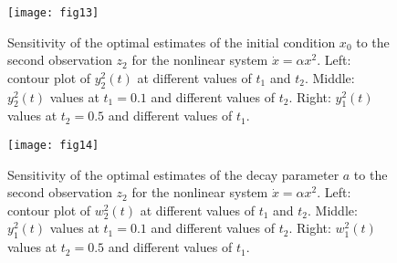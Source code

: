 \documentclass{article}
\begin{document}
\begin{figure}[ht!]
    \centering
    \texttt{[image: fig13]}
    \caption{Sensitivity of the optimal estimates of the initial condition $x_0$ to the second observation $z_2$ for the nonlinear system $\dot{x} = \alpha x^2$. Left: contour plot of $y_2^2(t)$ at different values of $t_1$ and $t_2$. Middle: $y_2^2(t)$ values at $t_1=0.1$ and different values of $t_2$. Right: $y_1^2(t)$ values at $t_2=0.5$ and different values of $t_1$.}
    \label{fig:y2non}
\end{figure}

\begin{figure}[ht!]
    \centering
    \texttt{[image: fig14]}
    \caption{Sensitivity of the optimal estimates of the decay parameter $a$ to the second observation $z_2$ for the nonlinear system $\dot{x} = \alpha x^2$. Left: contour plot of $w_2^2(t)$ at different values of $t_1$ and $t_2$. Middle: $y_1^2(t)$ values at $t_1=0.1$ and different values of $t_2$. Right: $w_1^2(t)$ values at $t_2=0.5$ and different values of $t_1$.}
    \label{fig:w2non}
\end{figure}



\end{document}
